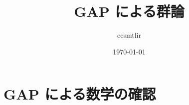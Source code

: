 \documentclass[a4paper,11pt]{article}
\title{GAP による群論}
\author{ecsmtlir}
\date{\today}
\begin{document}
\maketitle

\tableofcontents

\section{GAP による数学の確認}




\end{document}
